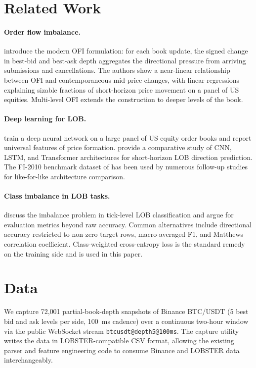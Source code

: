 \documentclass[11pt]{article}
\begin{document}
\section{Related Work}
\label{sec:related}

\paragraph{Order flow imbalance.} \citet{cont2014price} introduce
the modern OFI formulation: for each book update, the signed change
in best-bid and best-ask depth aggregates the directional pressure
from arriving submissions and cancellations. The authors show a
near-linear relationship between OFI and contemporaneous mid-price
changes, with linear regressions explaining sizable fractions of
short-horizon price movement on a panel of US equities. Multi-level
OFI \citep{xu2018multilevel} extends the construction to deeper
levels of the book.

\paragraph{Deep learning for LOB.}
\citet{sirignano2019universal} train a deep neural network on a
large panel of US equity order books and report universal features
of price formation. \citet{briola2020deep} provide a comparative
study of CNN, LSTM, and Transformer architectures for short-horizon
LOB direction prediction. The FI-2010 benchmark dataset of
\citet{ntakaris2018benchmark} has been used by numerous follow-up
studies for like-for-like architecture comparison.

\paragraph{Class imbalance in LOB tasks.}
\citet{passalis2017time} discuss the imbalance problem in tick-level
LOB classification and argue for evaluation metrics beyond raw
accuracy. Common alternatives include directional accuracy
restricted to non-zero target rows, macro-averaged F1, and
Matthews correlation coefficient. Class-weighted cross-entropy
loss is the standard remedy on the training side and is used in
this paper.

\section{Data}
\label{sec:data}

We capture 72{,}001 partial-book-depth snapshots of Binance
BTC/USDT (5 best bid and ask levels per side, 100~ms cadence)
over a continuous two-hour window via the public WebSocket stream
\texttt{btcusdt@depth5@100ms}. The capture utility writes the data
in LOBSTER-compatible CSV format, allowing the existing parser and
feature engineering code to consume Binance and LOBSTER data
interchangeably.
\end{document}
